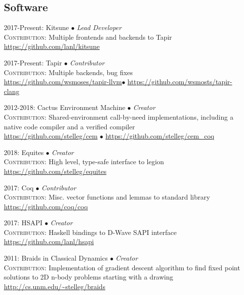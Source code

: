 \newcommand{\entry}[3]{\begin{samepage}{#1: #2 \\ #3}\end{samepage}}
\subsection{Software}
\entry{2017-Present}{Kitsune $\bullet$ \textit{\small{Lead Developer}}}
{\textsc{Contribution:} Multiple frontends and backends to Tapir\\ 
\url{https://github.com/lanl/kitsune}}
\entry{2017-Present}{Tapir $\bullet$ \textit{\small{Contributor}}}
{\textsc{Contribution:} Multiple backends, bug fixes \\ 
\url{https://github.com/wsmoses/tapir-llvm}$\bullet$
\url{https://github.com/wsmosts/tapir-clang}}
\entry{2012-2018}{Cactus Environment Machine $\bullet$
\textit{\small{Creator}}}
{\textsc{Contribution:} Shared-environment call-by-need implementations, including a native code
compiler and a verified compiler \\ 
\url{https://github.com/stelleg/cem} $\bullet$
\url{https://github.com/stelleg/cem\_coq}}
\entry{2018}{Equites $\bullet$ \textit{\small{Creator}}}
{\textsc{Contribution:} High level, type-safe interface to legion \\ 
\url{https://github.com/stelleg/equites}}
\entry{2017}{Coq $\bullet$ \textit{\small{Contributor}}} 
{\textsc{Contribution:} Misc. vector functions and lemmas to standard library\\ 
\url{https://github.com/coq/coq}}
\entry{2017}{HSAPI $\bullet$ \textit{\small{Creator}}}
{\textsc{Contribution:} Haskell bindings to D-Wave SAPI interface \\
\url{https://github.com/lanl/hsapi}}
\entry{2011}{Braids in Classical Dynamics $\bullet$ \textit{\small{Creator}}}
{\textsc{Contribution:} Implementation of gradient descent algorithm to find
fixed point solutions to 2D n-body problems starting with a drawing \\
\url{http://cs.unm.edu/~stelleg/braids}}
